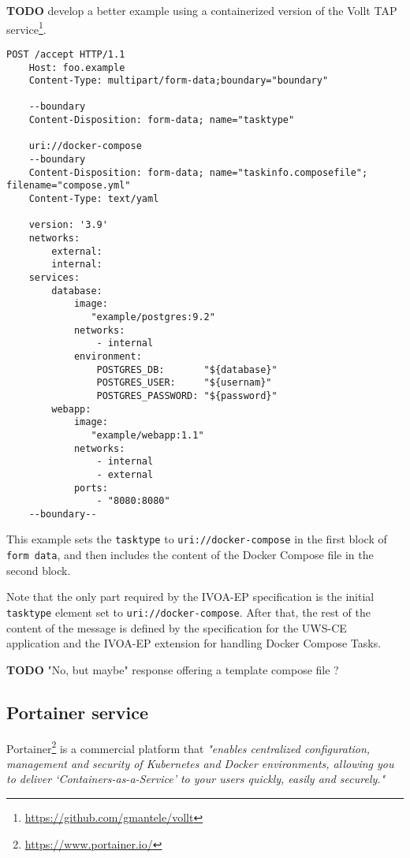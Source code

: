 \documentclass[11pt,a4paper]{ivoa}
\newcommand{\uwsce} {UWS-CE\xspace}
\newcommand{\ivoep} {IVOA-EP\xspace}
\newcommand{\dockercompose} {Docker Compose\xspace}
\newcommand{\portainer} {Portainer\xspace}
\newcommand{\codeword}[1] {\texttt{#1}}
\newcommand{\footurl}[1] {\footnote{\url{#1}}}
\begin{document}
\textbf{TODO} develop a better example using a containerized version of the Vollt TAP service\footurl{https://github.com/gmantele/vollt}.

\begin{lstlisting}[]
    POST /accept HTTP/1.1
    Host: foo.example
    Content-Type: multipart/form-data;boundary="boundary"

    --boundary
    Content-Disposition: form-data; name="tasktype"

    uri://docker-compose
    --boundary
    Content-Disposition: form-data; name="taskinfo.composefile"; filename="compose.yml"
    Content-Type: text/yaml

    version: '3.9'
    networks:
        external:
        internal:
    services:
        database:
            image:
               "example/postgres:9.2"
            networks:
                - internal
            environment:
                POSTGRES_DB:       "${database}"
                POSTGRES_USER:     "${usernam}"
                POSTGRES_PASSWORD: "${password}"
        webapp:
            image:
               "example/webapp:1.1"
            networks:
                - internal
                - external
            ports:
                - "8080:8080"
    --boundary--
\end{lstlisting}

This example sets the \codeword{tasktype} to \codeword{uri://docker-compose} in the first block of \codeword{form data}, and then includes the content of the \dockercompose file in the second block.

Note that the only part required by the \ivoep specification is the initial \codeword{tasktype} element set to \codeword{uri://docker-compose}. After that, the rest of the content of the message is defined by the specification for the \uwsce application and the \ivoep extension for handling \dockercompose Tasks.

\textbf{TODO} "No, but maybe" response offering a template compose file ?

\subsection{Portainer service}
\label{sec:portainer-service}
\portainer\footurl{https://www.portainer.io/} is a commercial platform that \textit{"enables centralized configuration, management and security of Kubernetes and Docker environments, allowing you to deliver ‘Containers-as-a-Service’ to your users quickly, easily and securely."}
\end{document}

